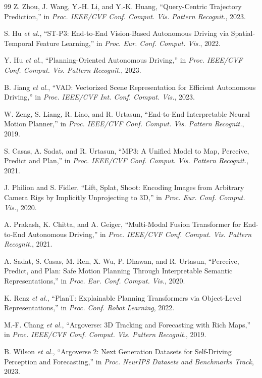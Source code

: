 \documentclass[10pt,journal,compsoc]{IEEEtran}
\begin{document}
\begin{thebibliography}{99}
Z. Zhou, J. Wang, Y.-H. Li, and Y.-K. Huang, ``Query-Centric Trajectory Prediction,'' in \emph{Proc. IEEE/CVF Conf. Comput. Vis. Pattern Recognit.}, 2023.

S. Hu \emph{et al.}, ``ST-P3: End-to-End Vision-Based Autonomous Driving via Spatial-Temporal Feature Learning,'' in \emph{Proc. Eur. Conf. Comput. Vis.}, 2022.

Y. Hu \emph{et al.}, ``Planning-Oriented Autonomous Driving,'' in \emph{Proc. IEEE/CVF Conf. Comput. Vis. Pattern Recognit.}, 2023.

B. Jiang \emph{et al.}, ``VAD: Vectorized Scene Representation for Efficient Autonomous Driving,'' in \emph{Proc. IEEE/CVF Int. Conf. Comput. Vis.}, 2023.

W. Zeng, S. Liang, R. Liao, and R. Urtasun, ``End-to-End Interpretable Neural Motion Planner,'' in \emph{Proc. IEEE/CVF Conf. Comput. Vis. Pattern Recognit.}, 2019.

S. Casas, A. Sadat, and R. Urtasun, ``MP3: A Unified Model to Map, Perceive, Predict and Plan,'' in \emph{Proc. IEEE/CVF Conf. Comput. Vis. Pattern Recognit.}, 2021.

J. Philion and S. Fidler, ``Lift, Splat, Shoot: Encoding Images from Arbitrary Camera Rigs by Implicitly Unprojecting to 3D,'' in \emph{Proc. Eur. Conf. Comput. Vis.}, 2020.

A. Prakash, K. Chitta, and A. Geiger, ``Multi-Modal Fusion Transformer for End-to-End Autonomous Driving,'' in \emph{Proc. IEEE/CVF Conf. Comput. Vis. Pattern Recognit.}, 2021.

A. Sadat, S. Casas, M. Ren, X. Wu, P. Dhawan, and R. Urtasun, ``Perceive, Predict, and Plan: Safe Motion Planning Through Interpretable Semantic Representations,'' in \emph{Proc. Eur. Conf. Comput. Vis.}, 2020.

K. Renz \emph{et al.}, ``PlanT: Explainable Planning Transformers via Object-Level Representations,'' in \emph{Proc. Conf. Robot Learning}, 2022.

M.-F. Chang \emph{et al.}, ``Argoverse: 3D Tracking and Forecasting with Rich Maps,'' in \emph{Proc. IEEE/CVF Conf. Comput. Vis. Pattern Recognit.}, 2019.

B. Wilson \emph{et al.}, ``Argoverse 2: Next Generation Datasets for Self-Driving Perception and Forecasting,'' in \emph{Proc. NeurIPS Datasets and Benchmarks Track}, 2023.


\end{thebibliography}
\end{document}
